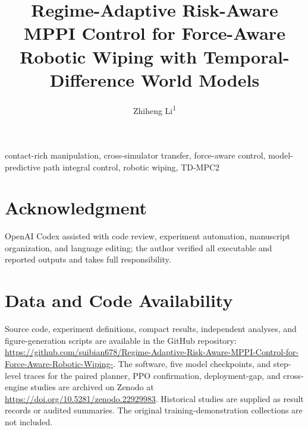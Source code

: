 \documentclass{ieeetj}
\title{Regime-Adaptive Risk-Aware MPPI Control for Force-Aware Robotic Wiping with Temporal-Difference World Models}
\author{Zhiheng Li\textsuperscript{1}}
\affil{Independent Researcher, Shanghai, China}
\begin{document}



\begin{IEEEkeywords}
contact-rich manipulation, cross-simulator transfer, force-aware control,
model-predictive path integral control, robotic wiping, TD-MPC2
\end{IEEEkeywords}
\maketitle
\pagestyle{submission}
\thispagestyle{submission}













\section*{Acknowledgment}
OpenAI Codex assisted with code review, experiment automation, manuscript
organization, and language editing; the author verified all executable and
reported outputs and takes full responsibility.

\section*{Data and Code Availability}
Source code, experiment definitions, compact results, independent analyses,
and figure-generation scripts are available in the
GitHub repository:\newline
\url{https://github.com/suibian678/Regime-Adaptive-Risk-Aware-MPPI-Control-for-Force-Aware-Robotic-Wiping-}.
The software, five model checkpoints, and step-level traces for the paired
planner, PPO confirmation, deployment-gap, and cross-engine studies are
archived on Zenodo at \url{https://doi.org/10.5281/zenodo.22929983}.
Historical studies are supplied as result records or audited summaries.
The original training-demonstration collections are not included.



\end{document}
